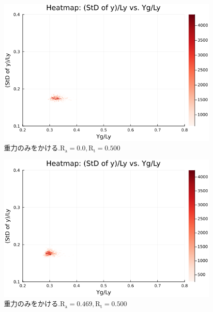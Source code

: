 \begin{figure}[H]
  \centering
  \includegraphics[scale=0.6]{image/dT0_heat/2024-01-15T14:30:48.227_mapg0_chi0_Ay50_rho0.4_T0.43_dT0.0_Rd0.0_Rt0.5_Ra0.0_g0.0003999718779659611_run4.0e7.png}
  \caption{$重力のみをかける. \text{R}_\text{a}=0.0,\text{R}_\text{t}=0.500$}
  \label{}
\end{figure}

\begin{figure}[H]
  \centering
  \includegraphics[scale=0.6]{image/dT0_heat/2024-01-15T14:30:48.295_mapg0_chi0_Ay50_rho0.4_T0.43_dT0.0_Rd0.0_Rt0.5_Ra0.4693845_g0.0003999718779659611_run4.0e7.png}
  \caption{$重力のみをかける. \text{R}_\text{a}=0.469,\text{R}_\text{t}=0.500$}
  \label{}
\end{figure}

